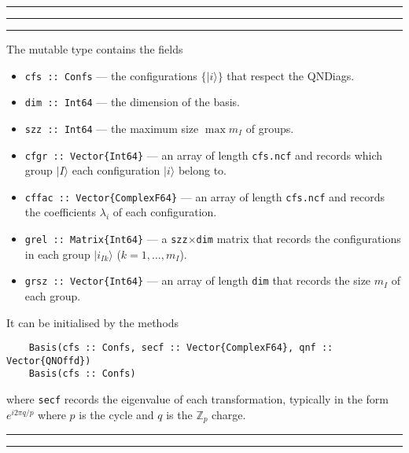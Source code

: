 \documentclass{timesjhep}
\newenvironment{block}[1]{\vspace{0.4\baselineskip}\hrule\vspace{0.10\baselineskip}\hrule\vspace{0.30\baselineskip}{\bfseries #1}\vspace{0.2\baselineskip}\hrule\vspace{0.3\baselineskip}
}{\vspace{0.2\baselineskip}\hrule\vspace{0.10\baselineskip}\hrule\vspace{0.5\baselineskip}}
\begin{document}
\begin{block}{\lstinline|Basis| --- Type}
The mutable type contains the fields
\begin{itemize}
    \item \lstinline|cfs :: Confs| --- the configurations $\{|i\rangle\}$ that respect the QNDiags.
    \item \lstinline|dim :: Int64| --- the dimension of the basis.
    \item \lstinline|szz :: Int64| --- the maximum size $\max m_I$ of groups.
    \item \lstinline|cfgr :: Vector{Int64}| --- an array of length \lstinline|cfs.ncf| and records which group $|I\rangle$ each configuration $|i\rangle$ belong to.
    \item \lstinline|cffac :: Vector{ComplexF64}| --- an array of length \lstinline|cfs.ncf| and records the coefficients $\lambda_i$ of each configuration.
    \item \lstinline|grel :: Matrix{Int64}| --- a \lstinline|szz|$\times$\lstinline|dim| matrix that records the configurations in each group $|i_{Ik}\rangle$ ($k=1,\dots,m_I$).
    \item \lstinline|grsz :: Vector{Int64}| --- an array of length \lstinline|dim| that records the size $m_I$ of each group.
\end{itemize}
It can be initialised by the methods 
\begin{lstlisting}
    Basis(cfs :: Confs, secf :: Vector{ComplexF64}, qnf :: Vector{QNOffd})
    Basis(cfs :: Confs)
\end{lstlisting}
where \lstinline|secf| records the eigenvalue of each transformation, typically in the form $e^{i2\pi q/p}$ where $p$ is the cycle and $q$ is the $\mathbb{Z}_p$ charge. 
\end{block}
\end{document}
